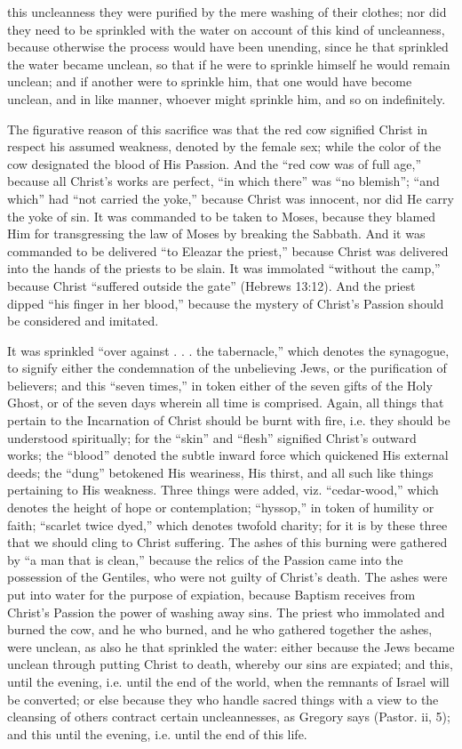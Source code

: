 this uncleanness they were purified by the mere washing of their clothes; nor did they need to be sprinkled with the water on account of this kind of uncleanness, because otherwise the process would have been unending, since he that sprinkled the water became unclean, so that if he were to sprinkle himself he would remain unclean; and if another were to sprinkle him, that one would have become unclean, and in like manner, whoever might sprinkle him, and so on indefinitely.

The figurative reason of this sacrifice was that the red cow signified Christ in respect his assumed weakness, denoted by the female sex; while the color of the cow designated the blood of His Passion. And the ``red cow was of full age,'' because all Christ's works are perfect, ``in which there'' was ``no blemish''; ``and which'' had ``not carried the yoke,'' because Christ was innocent, nor did He carry the yoke of sin. It was commanded to be taken to Moses, because they blamed Him for transgressing the law of Moses by breaking the Sabbath. And it was commanded to be delivered ``to Eleazar the priest,'' because Christ was delivered into the hands of the priests to be slain. It was immolated ``without the camp,'' because Christ ``suffered outside the gate'' (Hebrews 13:12). And the priest dipped ``his finger in her blood,'' because the mystery of Christ's Passion should be considered and imitated.

It was sprinkled ``over against . . . the tabernacle,'' which denotes the synagogue, to signify either the condemnation of the unbelieving Jews, or the purification of believers; and this ``seven times,'' in token either of the seven gifts of the Holy Ghost, or of the seven days wherein all time is comprised. Again, all things that pertain to the Incarnation of Christ should be burnt with fire, i.e. they should be understood spiritually; for the ``skin'' and ``flesh'' signified Christ's outward works; the ``blood'' denoted the subtle inward force which quickened His external deeds; the ``dung'' betokened His weariness, His thirst, and all such like things pertaining to His weakness. Three things were added, viz. ``cedar-wood,'' which denotes the height of hope or contemplation; ``hyssop,'' in token of humility or faith; ``scarlet twice dyed,'' which denotes twofold charity; for it is by these three that we should cling to Christ suffering. The ashes of this burning were gathered by ``a man that is clean,'' because the relics of the Passion came into the possession of the Gentiles, who were not guilty of Christ's death. The ashes were put into water for the purpose of expiation, because Baptism receives from Christ's Passion the power of washing away sins. The priest who immolated and burned the cow, and he who burned, and he who gathered together the ashes, were unclean, as also he that sprinkled the water: either because the Jews became unclean through putting Christ to death, whereby our sins are expiated; and this, until the evening, i.e. until the end of the world, when the remnants of Israel will be converted; or else because they who handle sacred things with a view to the cleansing of others contract certain uncleannesses, as Gregory says (Pastor. ii, 5); and this until the evening, i.e. until the end of this life.

